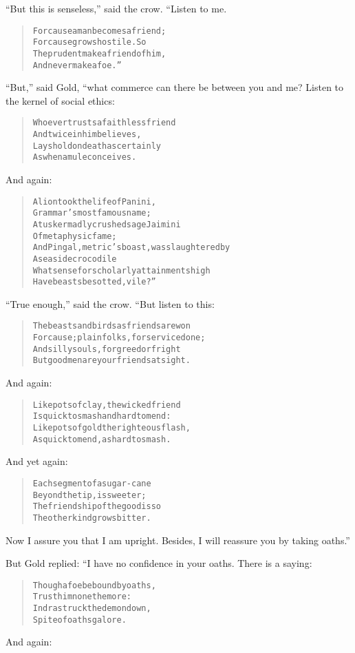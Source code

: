 \documentclass[article, twoside, 14pt]{memoir}
\renewenvironment{verbatim}{%
\begin{quote}%
\vskip -10pt%
\begin{alltt}\normalfont\large}{\end{alltt}%
\end{quote}%
\vskip -10pt
} %
\begin{document}
``But this is senseless,'' said the crow. “Listen to me.

\begin{verbatim}
For cause a man becomes a friend;
    For cause grows hostile. So
The prudent make a friend of him,
    And never make a foe.”
\end{verbatim}
``But,'' said Gold, “what commerce can there be between you and me?
Listen to the kernel of social ethics:

\begin{verbatim}
Whoever trusts a faithless friend
    And twice in him believes,
Lays hold on death as certainly
    As when a mule conceives.
\end{verbatim}
And again:

\begin{verbatim}
A lion took the life of Panini,
    Grammar's most famous name;
A tusker madly crushed sage Jaimini
    Of metaphysic fame;
And Pingal, metric's boast, was slaughtered by
    A seaside crocodile{\textemdash}
What sense for scholarly attainments high
    Have beasts besotted, vile?”
\end{verbatim}
``True enough,'' said the crow. “But listen to this:

\begin{verbatim}
The beasts and birds as friends are won
For cause; plain folks, for service done;
And silly souls, for greed or fright{\textemdash}
But good men are your friends at sight.
\end{verbatim}
And again:

\begin{verbatim}
Like pots of clay, the wicked friend
Is quick to smash and hard to mend:
Like pots of gold the righteous flash,
As quick to mend, as hard to smash.
\end{verbatim}
And yet again:

\begin{verbatim}
Each segment of a sugar-cane
    Beyond the tip, is sweeter;
The friendship of the good is so{\textemdash}
    The other kind grows bitter.
\end{verbatim}
Now I assure you that I am upright. Besides, I will reassure you by
taking oaths.”

But Gold replied: “I have no confidence in your oaths. There is a
saying:

\begin{verbatim}
Though a foe be bound by oaths,
    Trust him none the more:
Indra struck the demon down,
    Spite of oaths galore.
\end{verbatim}
And again:
\end{document}
